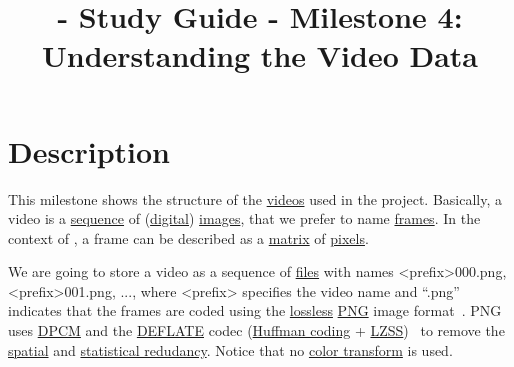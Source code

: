 
\title{\SM{} - Study Guide - Milestone 4: Understanding the Video Data}

\maketitle

\tableofcontents

\section{Description}

This milestone shows the structure of the
\href{https://en.wikipedia.org/wiki/Video}{videos} used in the
\theproject{} project. Basically, a video is a
\href{https://en.wikipedia.org/wiki/Sequence}{sequence} of
(\href{https://en.wikipedia.org/wiki/Digital_data}{digital})
\href{https://en.wikipedia.org/wiki/Image}{images}, that we prefer to
name \href{https://en.wikipedia.org/wiki/Film_frame}{frames}. In the
context of \theproject{}, a frame can be described as a
\href{https://en.wikipedia.org/wiki/Matrix_(mathematics)}{matrix} of
\href{https://en.wikipedia.org/wiki/Pixel}{pixels}.

We are going to store a video as a sequence of
\href{https://en.wikipedia.org/wiki/Computer_file}{files} with names
<prefix>000.png, <prefix>001.png, ..., where <prefix> specifies the
video name and ``.png'' indicates that the frames are coded using the
\href{https://en.wikipedia.org/wiki/Lossless_compression}{lossless}
\href{https://en.wikipedia.org/wiki/Portable_Network_Graphics}{PNG}
image format~\cite{roelofs1999png}. PNG uses
\href{https://en.wikipedia.org/wiki/Differential_pulse-code_modulation}{DPCM}
and the \href{https://en.wikipedia.org/wiki/DEFLATE}{DEFLATE} codec
(\href{https://en.wikipedia.org/wiki/Huffman_coding}{Huffman coding} +
\href{https://en.wikipedia.org/wiki/Lempel-Ziv-Storer-Szymanski}{LZSS})~\cite{nelson96datacompression}
to remove the
\href{https://en.wikipedia.org/wiki/Image_compression}{spatial} and
\href{https://en.wikipedia.org/wiki/Data_compression}{statistical
  redudancy}. Notice that no
\href{https://en.wikipedia.org/wiki/YUV}{color transform} is used.

